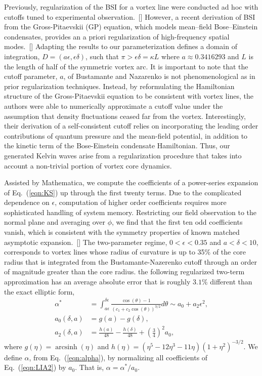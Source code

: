 \documentclass[aps,graphicx,reprint,onecolumn,12pt,tightenlines,longbibliography]{revtex4-1}
\DeclareMathOperator{\arcsinh}{arcsinh}
\newcommand{\sas}[2]{{#2}}
\begin{document}
Previously, regularization of the BSI for a vortex line were conducted ad hoc with cutoffs tuned to experimental observation.~[] However, a recent derivation of BSI from the Gross-Pitaevskii (GP) equation, which models mean--field Bose--Einstein condensates, provides an a priori regularization of high-frequency spatial modes.~[] Adapting the results to our parameterization defines a domain of integration, ${D} = (a \epsilon, \epsilon \delta)$, such that $\pi > \epsilon \delta = \kappa L$ where $a\approx 0.3416293$ and $L$ is the length of half  of the symmetric vortex arc. \sas{}{It is important to note that the cutoff parameter, $a$, of Bustamante and Nazarenko is not phenomenological as in prior regularization techniques. Instead, by reformulating the Hamiltonian structure of the Gross-Pitaevskii equation to be consistent with vortex lines, the authors were able to numerically approximate a cutoff value under the assumption that density fluctuations ceased far from the vortex. Interestingly, their derivation of a self-consistent cutoff relies on incorporating the leading order contributions of quantum pressure and the mean-field potential, in addition to the kinetic term of the Bose-Einstein condensate Hamiltonian. Thus, our generated Kelvin waves arise from a regularization procedure that takes into account a non-trivial portion of vortex core dynamics.} 

Assisted by Mathematica, we compute the coefficients of a power-series expansion of Eq.~(\ref{eqn:KS}) up through the first twenty terms. Due to the complicated dependence on $\epsilon$, computation of higher order coefficients requires more sophisticated handling of system memory. Restricting our field observation to the normal plane and averaging over $\phi$, we find that the first ten odd coefficients vanish, which is consistent with the symmetry properties of known matched asymptotic expansion.~[] \sas{For t}{T}he \sas{}{two-}parameter regime, \sas{$(\epsilon,\delta)\in(0,0.35)\times(a,10)$}{$0<\epsilon<0.35$ and $a < \delta < 10$}, \sas{}{corresponds to vortex lines whose radius of curvature is up to 35\% of the core radius that is integrated from the Bustamante-Nazerenko cutoff through an order of magnitude greater than the core radius.} the following regularized two-term approximation has an average absolute error that is roughly $3.1\%$ different than the exact elliptic form, 
%
\begin{align}
\label{eqn:LIA2}\alpha^{*} &= \int_{a\epsilon}^{\delta \epsilon} \frac{\cos(\theta) -1 }{(c_1 + c_2 \cos(\theta))^{3/2}}d\theta \sim a_{0} + a_{2} \epsilon^{2},\\
a_{0}(\delta,a)& = g(a)-g(\delta),\\
 a_{2}(\delta,a)& = \frac{h(a)}{48}-\frac{h(\delta)}{48}+ \left(\frac{3}{4}\right)^{2}a_{0},  
\end{align}
%
where $g(\eta)= \arcsinh(\eta)$ and $ h(\eta) =(\eta^5-12\eta^3-11\eta) (1+\eta^{2})^{-3/2} $. \sas{}{We define $\alpha$, from Eq.~(\ref{eqn:alpha}), by normalizing all coefficients of Eq.~(\ref{eqn:LIA2}) by $a_{0}$. That is, $ \alpha=\alpha^{*}/a_{0}$.}
\end{document}

